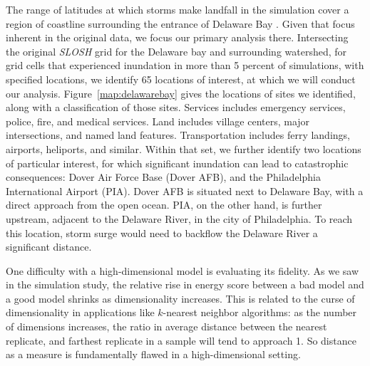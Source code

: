 The range of latitudes at which storms make landfall in the simulation cover a region of
    coastline surrounding the entrance of Delaware Bay .  Given that focus inherent in the original data, we focus our primary analysis there.
    Intersecting the original \emph{SLOSH} grid for the Delaware bay and surrounding watershed, 
    for grid cells that experienced inundation in more than 5 percent of simulations, 
    with specified locations, we identify 65 locations of interest, at which we will conduct 
    our analysis.  Figure~\ref{map:delawarebay} gives the locations of sites we identified, along
    with a classification of those sites.  Services includes emergency services, police, fire,
    and medical services.  Land includes village centers, major intersections, and named
    land features.  Transportation includes ferry landings, airports, heliports, and similar.
    Within that set, we further identify two locations of particular interest, 
    for which significant inundation can lead to catastrophic consequences:  
    Dover Air Force Base (Dover AFB), and the Philadelphia International 
    Airport (PIA). Dover AFB is situated next to Delaware Bay, with a direct approach from the
    open ocean.  PIA, on the other hand, is further upstream, adjacent to the Delaware River, 
    in the city of Philadelphia.  To reach this location, storm surge would need to backflow 
    the Delaware River a significant distance.

One difficulty with a high-dimensional model is evaluating its fidelity.  As we saw in the simulation
    study, the relative rise in energy score between a bad model and a good model shrinks as
    dimensionality increases.  This is related to the curse of dimensionality in applications like
    $k$-nearest neighbor algorithms: as the number of dimensions increases, the ratio in average
    distance between the nearest replicate, and farthest replicate in a sample will tend to approach 1.
    So distance as a measure is fundamentally flawed in a high-dimensional setting.

